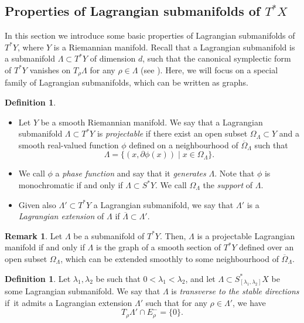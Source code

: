 \documentclass[10pt]{amsart}
\let\sep\mid
\theoremstyle{plain}
\theoremstyle{definition}
\newtheorem{definition}[theorem]{Definition}
\newtheorem{remark}[theorem]{Remark}
\begin{document}
\subsection{Properties of Lagrangian submanifolds of $T^*X$}\label{ss:on_lagrangian_submfs}
In this section we introduce some basic properties of Lagrangian submanifolds of $T^*Y$, where $Y$ is a Riemannian manifold. Recall that a Lagrangian submanifold is a submanifold $\Lambda\subset T^*Y$ of dimension $d$, such that the canonical symplectic form of $T^*Y$ vanishes on $T_\rho \Lambda$ for any $\rho \in \Lambda$ (see \cite[Chap.\,1]{DiSj}). Here, we will focus on a special family of Lagrangian submanifolds, which can be written as graphs.

\skpt
\begin{definition}
\begin{itemize}
\item Let $Y$ be a smooth Riemannian manifold. We say that a Lagrangian submanifold $\Lambda\subset T^*Y$ is \emph{projectable} if there exist an open subset $\Omega_\Lambda\subset Y$ and a smooth real-valued function $\phi$ defined on a neighbourhood of $\overline{\Omega}_\Lambda$ such that
\[
\Lambda=\{(x,\partial\phi(x))\sep x\in\Omega_\Lambda\}.
\]
\item We call $\phi$ a \emph{phase function} and say that it \emph{generates} $\Lambda$. Note that $\phi$ is monochromatic if and only if $\Lambda\subset S^*Y$. We call $\Omega_\Lambda$ the \emph{support} of $\Lambda$.
\item Given also $\Lambda'\subset T^*Y$ a Lagrangian submanifold, we say that $\Lambda'$ is a \emph{Lagrangian extension} of $\Lambda$ if $\overline{\Lambda}\subset\Lambda'$.
\end{itemize}
\end{definition}

\begin{remark}\label{Rem:CriterionProj}
Let $\Lambda$ be a submanifold of $T^*Y$. Then, $\Lambda$ is a projectable Lagrangian manifold if and only if $\Lambda$ is the graph of a smooth section of $T^*Y$ defined over an open subset $\Omega_\Lambda$, which can be extended smoothly to some neighbourhood of $\overline{\Omega}_\Lambda$.
\end{remark}

\begin{definition}\label{def:transverse_to_stable_directions}
Let $\lambda_1,\lambda_2$ be such that $0<\lambda_1<\lambda_2$, and let $\Lambda \subset S^*_{[\lambda_1,\lambda_2]}X$ be some Lagrangian submanifold. We say that $\Lambda$ is \emph{transverse to the stable directions} if~it admits a Lagrangian extension $\Lambda'$ such that for any $\rho\in \Lambda'$, we have
\[
T_\rho \Lambda' \cap E_\rho^- = \{0\}.
\]
\end{definition}
\end{document}
